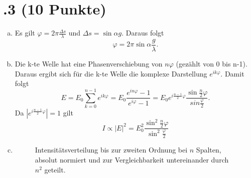 \section*{\nr.3 \titthree (10 Punkte)}
\begin{enumerate}[(a)]
\item Es gilt $\varphi = 2\pi\frac{\Delta s}{\lambda}$ und $\Delta s = \sin{\alpha }g$. Daraus folgt
\begin{equation}
	\varphi = 2\pi\sin{\alpha}\frac{g}{\lambda}.
\end{equation}
\item Die k-te Welle hat eine Phasenverschiebung von $n\varphi$ (gezählt von 0 bis n-1). Daraus ergibt sich für die k-te Welle die komplexe Darstellung $e^{ik\varphi}$. Damit folgt
\begin{equation}
	E = E_0 \sum_{k=0}^{n-1} e^{ik\varphi} = E_0 \frac{e^{in\varphi} - 1}{e^{i\varphi}  - 1} = E_0 e^{i\frac{n-1}{2}\varphi}\frac{\sin{\frac{n}{2}\varphi}}{sin{\frac{\varphi}{2}}}.
\end{equation}
Da $|e^{i\frac{n-1}{2}\varphi}| = 1$ gilt
\begin{equation}
	I \propto |E|^2 = E_0^2 \frac{\sin^2{\frac{n}{2}\varphi}}{\sin^2{\frac{\varphi}{2}}}
\end{equation}

\item
\begin{figure}[htbp]
\centering

\caption{Intensitätsverteilung bis zur zweiten Ordnung bei $n$ Spalten, absolut normiert und zur Vergleichbarkeit untereinander durch $n^2$ geteilt.}
\label{fig:beugung}
\end{figure}
\end{enumerate}
